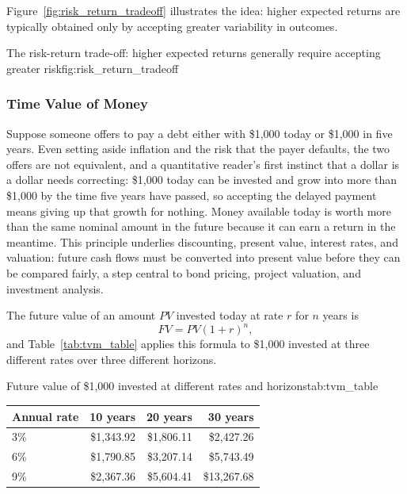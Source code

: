 \documentclass[../ai_in_finance]{subfiles}
\begin{document}
Figure~\ref{fig:risk_return_tradeoff} illustrates the idea: higher expected returns are typically obtained only by accepting greater variability in outcomes.

\begin{bookfigure}[htbp]{The risk-return trade-off: higher expected returns generally require accepting greater risk}{fig:risk_return_tradeoff}
\end{bookfigure}

\subsubsection*{Time Value of Money}

Suppose someone offers to pay a debt either with \$1,000 today or \$1,000 in five years. Even setting aside inflation and the risk that the payer defaults, the two offers are not equivalent, and a quantitative reader's first instinct that a dollar is a dollar needs correcting: \$1,000 today can be invested and grow into more than \$1,000 by the time five years have passed, so accepting the delayed payment means giving up that growth for nothing. Money available today is worth more than the same nominal amount in the future because it can earn a return in the meantime. This principle underlies discounting, present value, interest rates, and valuation: future cash flows must be converted into present value before they can be compared fairly, a step central to bond pricing, project valuation, and investment analysis.

The future value of an amount $PV$ invested today at rate $r$ for $n$ years is
$$FV = PV(1+r)^n,$$
 and Table~\ref{tab:tvm_table} applies this formula to \$1,000 invested at three different rates over three different horizons.

\begin{booktable}[htbp]{Future value of \$1,000 invested at different rates and horizons}{tab:tvm_table}
\begin{tabular}{lrrr}
\toprule
Annual rate & 10 years & 20 years & 30 years \\
\midrule
3\% & \$1,343.92 & \$1,806.11 & \$2,427.26 \\
6\% & \$1,790.85 & \$3,207.14 & \$5,743.49 \\
9\% & \$2,367.36 & \$5,604.41 & \$13,267.68 \\
\bottomrule
\end{tabular}
\end{booktable}
\end{document}

